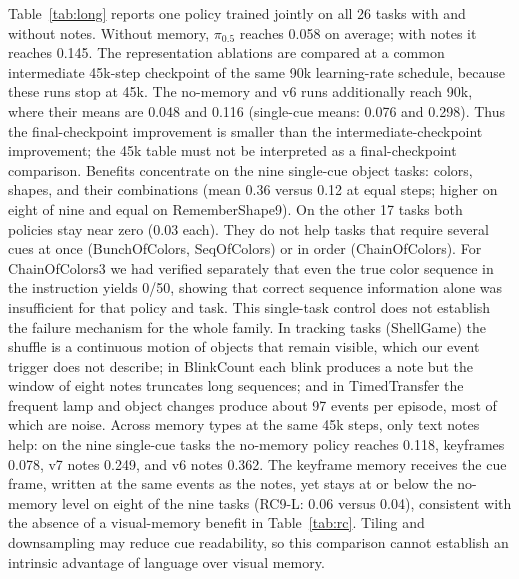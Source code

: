 \documentclass{IJCAS}
\begin{document}
Table~\ref{tab:long} reports one policy trained jointly on all 26 tasks with and without notes.
Without memory, $\pi_{0.5}$ reaches 0.058 on average; with notes it reaches 0.145. The representation ablations are compared at a common intermediate 45k-step checkpoint of the same 90k learning-rate schedule, because these runs stop at 45k. The no-memory and v6 runs additionally reach 90k, where their means are 0.048 and 0.116 (single-cue means: 0.076 and 0.298). Thus the final-checkpoint improvement is smaller than the intermediate-checkpoint improvement; the 45k table must not be interpreted as a final-checkpoint comparison.
Benefits concentrate on the nine single-cue object tasks: colors, shapes, and their combinations (mean 0.36 versus 0.12 at equal steps; higher on eight of nine and equal on RememberShape9). On the other 17 tasks both policies stay near zero (0.03 each).
They do not help tasks that require several cues at once (BunchOfColors, SeqOfColors) or in order (ChainOfColors).
For ChainOfColors3 we had verified separately that even the true color sequence in the instruction yields 0/50, showing that correct sequence information alone was insufficient for that policy and task. This single-task control does not establish the failure mechanism for the whole family.
In tracking tasks (ShellGame) the shuffle is a continuous motion of objects that remain visible, which our event trigger does not describe; in BlinkCount each blink produces a note but the window of eight notes truncates long sequences; and in TimedTransfer the frequent lamp and object changes produce about 97 events per episode, most of which are noise.
Across memory types at the same 45k steps, only text notes help: on the nine single-cue tasks the no-memory policy reaches 0.118, keyframes 0.078, v7 notes 0.249, and v6 notes 0.362. The keyframe memory receives the cue frame, written at the same events as the notes, yet stays at or below the no-memory level on eight of the nine tasks (RC9-L: 0.06 versus 0.04), consistent with the absence of a visual-memory benefit in Table~\ref{tab:rc}. Tiling and downsampling may reduce cue readability, so this comparison cannot establish an intrinsic advantage of language over visual memory.
\end{document}
